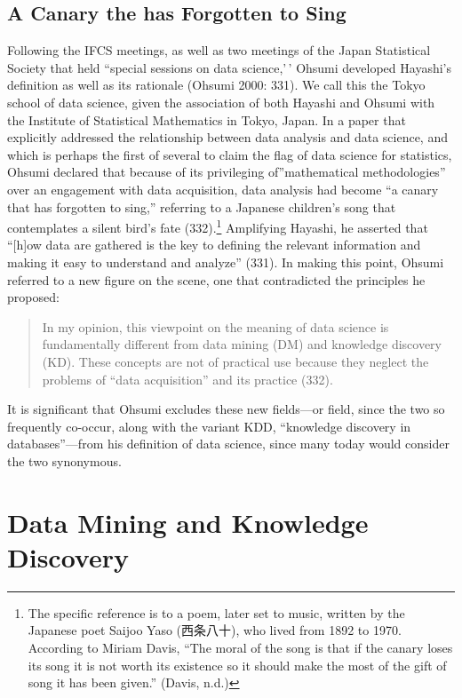 \documentclass[
  letterpaper,
]{report}
\begin{document}
\hypertarget{a-canary-the-has-forgotten-to-sing}{%
\subsection{A Canary the has Forgotten to
Sing}\label{a-canary-the-has-forgotten-to-sing}}

Following the IFCS meetings, as well as two meetings of the Japan
Statistical Society that held ``special sessions on data science,'\,'
Ohsumi developed Hayashi's definition as well as its rationale (Ohsumi
2000: 331). We call this the Tokyo school of data science, given the
association of both Hayashi and Ohsumi with the Institute of Statistical
Mathematics in Tokyo, Japan. In a paper that explicitly addressed the
relationship between data analysis and data science, and which is
perhaps the first of several to claim the flag of data science for
statistics, Ohsumi declared that because of its privileging
of''mathematical methodologies'' over an engagement with data
acquisition, data analysis had become ``a canary that has forgotten to
sing,'' referring to a Japanese children's song that contemplates a
silent bird's fate (332).\footnote{The specific reference is to a poem,
  later set to music, written by the Japanese poet Saijoo Yaso
  (西条八十), who lived from 1892 to 1970. According to Miriam Davis,
  ``The moral of the song is that if the canary loses its song it is not
  worth its existence so it should make the most of the gift of song it
  has been given.'' (Davis, n.d.)} Amplifying Hayashi, he asserted that
``{[}h{]}ow data are gathered is the key to defining the relevant
information and making it easy to understand and analyze'' (331). In
making this point, Ohsumi referred to a new figure on the scene, one
that contradicted the principles he proposed:

\begin{quote}
In my opinion, this viewpoint on the meaning of data science is
fundamentally different from data mining (DM) and knowledge discovery
(KD). These concepts are not of practical use because they neglect the
problems of ``data acquisition'' and its practice (332).
\end{quote}

It is significant that Ohsumi excludes these new fields---or field,
since the two so frequently co-occur, along with the variant KDD,
``knowledge discovery in databases''---from his definition of data
science, since many today would consider the two synonymous.

\hypertarget{data-mining-and-knowledge-discovery}{%
\section{Data Mining and Knowledge
Discovery}\label{data-mining-and-knowledge-discovery}}
\end{document}
